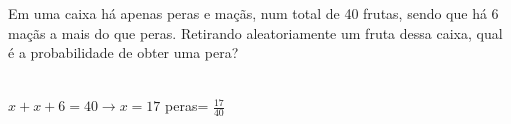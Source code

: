 \begin{ex}
Em uma caixa há apenas peras e maçãs, num total de 40 frutas, sendo que há 6 maçãs a mais do que peras. Retirando aleatoriamente um fruta dessa caixa, qual é a probabilidade de obter uma pera?
  \begin{sol}
   \phantom{A} \\
   $ x+x+6=40 \rightarrow x=17$ \hspace{0,5cm} peras= $\frac{17}{40}$ 
  \end{sol}
\end{ex}